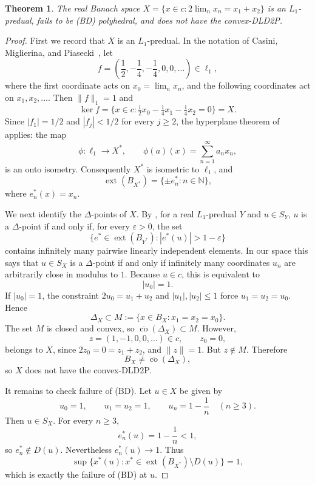 \documentclass[11pt]{article}
\newtheorem{theorem}{Theorem}
\newcommand{\N}{\mathbb{N}}
\newcommand{\Ball}{B}
\newcommand{\ext}{\operatorname{ext}}
\newcommand{\cconv}{\overline{\operatorname{co}}}
\newcommand{\DeltaX}{\Delta_X}
\begin{document}
\begin{theorem}
The real Banach space \(X=\{x\in c:2\lim_n x_n=x_1+x_2\}\) is an
\(L_1\)-predual, fails to be (BD) polyhedral, and does not have the
convex-DLD2P.
\end{theorem}

\begin{proof}
First we record that \(X\) is an \(L_1\)-predual.  In the notation of
Casini, Miglierina, and Piasecki~\cite{CMP2014}, let
\[
  f=\left(\frac12,-\frac14,-\frac14,0,0,\ldots\right)\in \ell_1,
\]
where the first coordinate acts on \(x_0=\lim_n x_n\), and the following
coordinates act on \(x_1,x_2,\ldots\).  Then \(\|f\|_1=1\) and
\[
  \ker f=\{x\in c:\tfrac12x_0-\tfrac14x_1-\tfrac14x_2=0\}=X.
\]
Since \(|f_1|=1/2\) and \(|f_j|<1/2\) for every \(j\geq 2\), the
hyperplane theorem of~\cite[Theorem 4.3]{CMP2014} applies: the map
\[
  \phi:\ell_1\longrightarrow X^*,\qquad
  \phi(a)(x)=\sum_{n=1}^\infty a_nx_n,
\]
is an onto isometry.  Consequently \(X^*\) is isometric to \(\ell_1\), and
\[
  \ext(\Ball_{X^*})=\{\pm e_n^*:n\in\N\},
\]
where \(e_n^*(x)=x_n\).

We next identify the \(\Delta\)-points of \(X\).  By
\cite[Theorem 3.2]{MRZ2010}, for a real \(L_1\)-predual \(Y\) and
\(u\in S_Y\), \(u\) is a \(\Delta\)-point if and only if, for every
\(\varepsilon>0\), the set
\[
  \{e^*\in \ext(\Ball_{Y^*}): |e^*(u)|>1-\varepsilon\}
\]
contains infinitely many pairwise linearly independent elements.  In our
space this says that \(u\in S_X\) is a \(\Delta\)-point if and only if
infinitely many coordinates \(u_n\) are arbitrarily close in modulus to
\(1\).  Because \(u\in c\), this is equivalent to
\[
  |u_0|=1.
\]
If \(|u_0|=1\), the constraint \(2u_0=u_1+u_2\) and
\(|u_1|,|u_2|\leq 1\) force \(u_1=u_2=u_0\).  Hence
\[
  \DeltaX\subset M:=\{x\in \Ball_X:x_1=x_2=x_0\}.
\]
The set \(M\) is closed and convex, so \(\cconv(\DeltaX)\subset M\).
However,
\[
  z=(1,-1,0,0,\ldots)\in c,\qquad z_0=0,
\]
belongs to \(X\), since \(2z_0=0=z_1+z_2\), and \(\|z\|=1\).  But
\(z\notin M\).  Therefore
\[
  \Ball_X\neq \cconv(\DeltaX),
\]
so \(X\) does not have the convex-DLD2P.

It remains to check failure of (BD).  Let \(u\in X\) be given by
\[
  u_0=1,\qquad u_1=u_2=1,\qquad u_n=1-\frac1n\quad(n\geq 3).
\]
Then \(u\in S_X\).  For every \(n\geq 3\),
\[
  e_n^*(u)=1-\frac1n<1,
\]
so \(e_n^*\notin D(u)\).  Nevertheless \(e_n^*(u)\to 1\).  Thus
\[
  \sup\{x^*(u):x^*\in\ext(\Ball_{X^*})\setminus D(u)\}=1,
\]
which is exactly the failure of (BD) at \(u\).
\end{proof}
\end{document}
